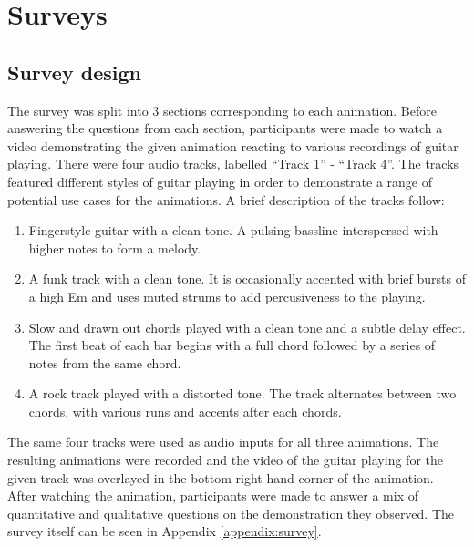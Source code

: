 \documentclass[../initial_thesis.tex]{subfiles}
\begin{document}
\section{Surveys}

\subsection{Survey design}
The survey was split into 3 sections corresponding to each animation. Before answering the questions from each section, participants were made to watch a video demonstrating the given animation reacting to various recordings of guitar playing. There were four audio tracks, labelled ``Track 1'' - ``Track 4''. The tracks featured different styles of guitar playing in order to demonstrate a range of potential use cases for the animations. A brief description of the tracks follow:

\begin{enumerate}
\item {Fingerstyle guitar with a clean tone. A pulsing bassline interspersed with higher notes to form a melody.} %
\item {A funk track with a clean tone. It is occasionally accented with brief bursts of a high Em and uses muted strums to add percusiveness to the playing.}
\item {Slow and drawn out chords played with a clean tone and a subtle delay effect. The first beat of each bar begins with a full chord followed by a series of notes from the same chord.}
\item {A rock track played with a distorted tone. The track alternates between two chords, with various runs and accents after each chords.}
\end{enumerate}

The same four tracks were used as audio inputs for all three animations. The resulting animations were recorded and the video of the guitar playing for the given track was overlayed in the bottom right hand corner of the animation. After watching the animation, participants were made to answer a mix of quantitative and qualitative questions on the demonstration they observed. The survey itself can be seen in Appendix \ref{appendix:survey}.
\end{document}
